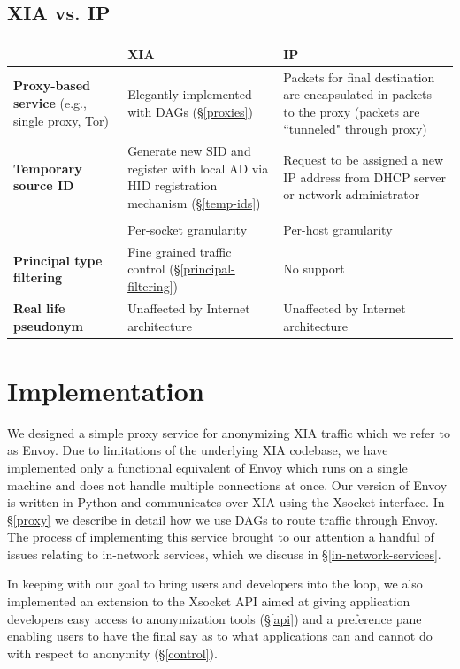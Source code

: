 \documentclass{article}
\begin{document}
\subsection{XIA vs. IP}
\begin{center}
	\begin{tabular}{p{3cm} || p{4.5cm} | p{4.5cm}}
	& \textbf{XIA} 	&	\textbf{IP}\\
	\hline
	\hline
	{\bf Proxy-based service} (e.g., single proxy, Tor) & Elegantly implemented with DAGs (\S\ref{proxies}) & Packets for final destination are encapsulated in packets to the proxy (packets are ``tunneled" through proxy)\\
	\hline
	{\bf Temporary source ID} & Generate new SID and register with local AD via HID registration mechanism (\S\ref{temp-ids}) & Request to be assigned a new IP address from DHCP server or network administrator\\
	& & \\
	& Per-socket granularity & Per-host granularity\\
	\hline
	{\bf Principal type filtering} & Fine grained traffic control (\S\ref{principal-filtering})& No support \\
	\hline
	{\bf Real life pseudonym} & Unaffected by Internet architecture & Unaffected by Internet architecture \\
	\hline
	\end{tabular}
\end{center}


\section{Implementation}
\label{implementation}
We designed a simple proxy service for anonymizing XIA traffic which we refer to as Envoy. Due to limitations of the underlying XIA codebase, we have implemented only a functional equivalent of Envoy which runs on a single machine and does not handle multiple connections at once. Our version of Envoy is written in Python and communicates over XIA using the Xsocket interface. In \S\ref{proxy} we describe in detail how we use DAGs to route traffic through Envoy. The process of implementing this service brought to our attention a handful of issues relating to in-network services, which we discuss in \S\ref{in-network-services}.

In keeping with our goal to bring users and developers into the loop, we also implemented an extension to the Xsocket API aimed at giving application developers easy access to anonymization tools (\S\ref{api}) and a preference pane enabling users to have the final say as to what applications can and cannot do with respect to anonymity (\S\ref{control}).
\end{document}
